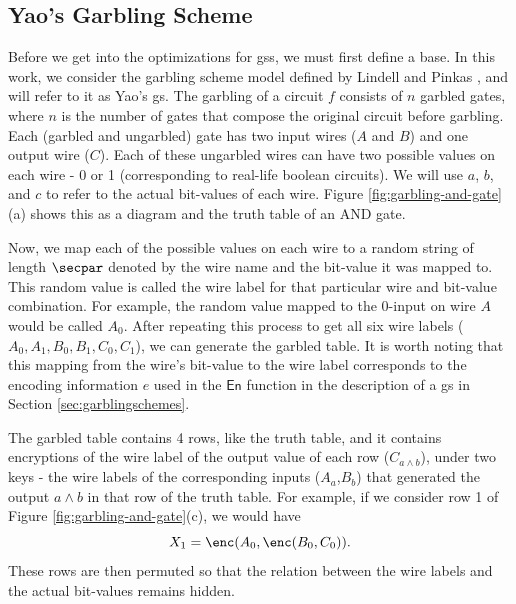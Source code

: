 \subsection{Yao's Garbling Scheme}
\label{subsec:yaosgarblingscheme}
Before we get into the optimizations for \acrlong{gs}s, we must first define a base. In this work, we consider the garbling scheme model defined by Lindell and Pinkas \cite{JC:LinPin09}, and will refer to it as Yao's \acrlong{gs}. The garbling of a circuit $f$ consists of $n$ garbled gates, where $n$ is the number of gates that compose the original circuit before garbling. Each (garbled and ungarbled) gate has two input wires ($A$ and $B$) and one output wire ($C$). Each of these ungarbled wires can have two possible values on each wire - 0 or 1 (corresponding to real-life boolean circuits). We will use $a$, $b$, and $c$ to refer to the actual bit-values of each wire. Figure \ref{fig:garbling-and-gate}(a) shows this as a diagram and the truth table of an AND gate.



Now, we map each of the possible values on each wire to a random string of length $\secpar$ denoted by the wire name and the bit-value it was mapped to. This random value is called the wire label for that particular wire and bit-value combination. For example, the random value mapped to the 0-input on wire $A$ would be called $A_{0}$. After repeating this process to get all six wire labels ($A_0,A_1,B_0,B_1,C_0,C_1$), we can generate the garbled table. It is worth noting that this mapping from the wire's bit-value to the wire label corresponds to the encoding information $e$ used in the $\mathsf{En}$ function in the description of a \acrlong{gs} in Section \ref{sec:garblingschemes}. 

The garbled table contains 4 rows, like the truth table, and it contains encryptions of the wire label of the output value of each row ($C_{a\land b}$), under two keys - the wire labels of the corresponding inputs ($A_a$,$B_b$) that generated the output $a\land b$ in that row of the truth table. For example, if we consider row 1 of Figure \ref{fig:garbling-and-gate}(c), we would have 
\[X_1 = \enc(A_0, \enc(B_0, C_0)).\]
These rows are then permuted so that the relation between the wire labels and the actual bit-values remains hidden.

